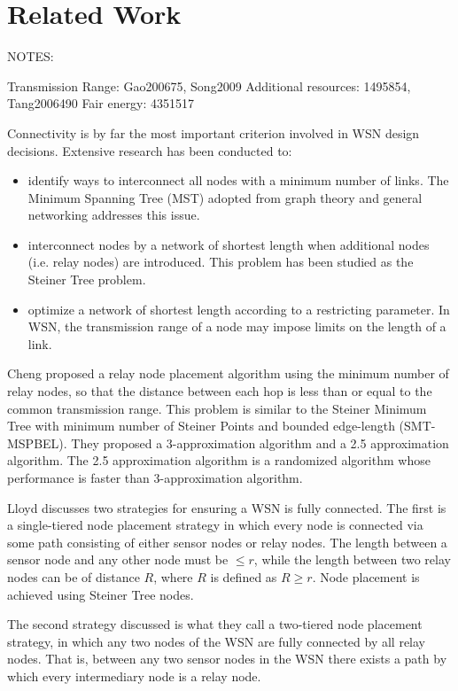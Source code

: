 \section{Related Work}\label{Related Work}

NOTES:

Transmission Range: Gao200675, Song2009
Additional resources: 1495854, Tang2006490
Fair energy: 4351517



Connectivity is by far the most important criterion involved in WSN design decisions. Extensive research has been conducted to:
\begin{itemize}
\item identify ways to interconnect all nodes with a minimum number of links. The Minimum Spanning Tree (MST) adopted from graph theory and general networking addresses this issue.
\item interconnect nodes by a network of shortest length when additional nodes (i.e. relay nodes) are introduced. This problem has been studied as the Steiner Tree problem.
\item optimize a network of shortest length according to a restricting parameter. In WSN, the transmission range of a node may impose limits on the length of a link.
\end{itemize}

Cheng \cite{RelaySensor} proposed a relay node placement algorithm using the minimum number of relay nodes, so that the distance between each hop is less than or equal to the common transmission range. This problem is similar to the Steiner Minimum Tree with minimum number of Steiner Points and bounded edge-length (SMT-MSPBEL). They proposed a 3-approximation algorithm and a 2.5 approximation algorithm. The 2.5 approximation algorithm is a randomized algorithm whose performance is faster than 3-approximation algorithm.

Lloyd \cite{1191701} discusses two strategies for ensuring a WSN is fully connected.  The first is a single-tiered node placement strategy in which every node is connected via some path consisting of either sensor nodes or relay nodes.  The length between a sensor node and any other node must be $ \leq r$, while the length between two relay nodes can be of distance $R$, where $R$ is defined as $R \geq r$.  Node placement is achieved using Steiner Tree nodes.

The second strategy discussed is what they call a two-tiered node placement strategy, in which any two nodes of the WSN are fully connected by all relay nodes. That is, between any two sensor nodes in the WSN there exists a path by which every intermediary node is a relay node.

